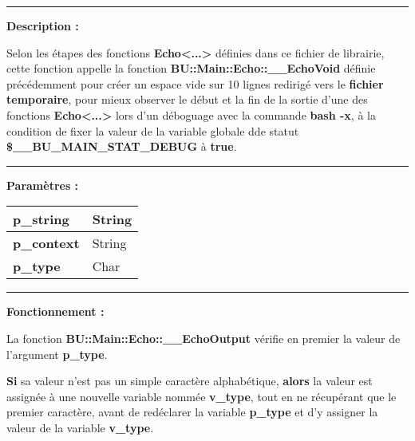 \documentclass[a4paper,10pt]{article}
\begin{document}

\par\noindent\rule{\textwidth}{0.4pt}

\begin{justify}
    \textbf{Description :}

    Selon les étapes des fonctions \textbf{\color{mauve}Echo<...>} définies dans ce fichier de librairie, cette fonction appelle la fonction \textbf{\color{mauve}BU::Main::Echo::\_\_EchoVoid} définie précédemment pour créer un espace vide sur 10 lignes redirigé vers le \textbf{\color{lime}fichier temporaire}, pour mieux observer le début et la fin de la sortie d'une des fonctions \textbf{\color{mauve}Echo<...>} lors d'un déboguage avec la commande \textbf{\color{gray}bash -x}, à la condition de fixer la valeur de la variable globale dde statut \textbf{\color{orange}\$\_\_BU\_MAIN\_STAT\_DEBUG} à \textbf{true}.
\end{justify}


\par\noindent\rule{\textwidth}{0.4pt}

\begin{justify}
    \textbf{Paramètres :}

    \begin{tabular}{|l|l|}
        \hline
        \textbf{\color{orange}p\_string} & String\\
        \hline
        \textbf{\color{orange}p\_context} & String\\
        \hline
        \textbf{\color{orange}p\_type} & Char\\
        \hline
    \end{tabular}
\end{justify}\setlength{\parskip}{2em}


\par\noindent\rule{\textwidth}{0.4pt}\setlength{\parskip}{1em}

\begin{justify}
    \textbf{Fonctionnement :}

    La fonction \textbf{\color{mauve}BU::Main::Echo::\_\_EchoOutput} vérifie en premier la valeur de l'argument \textbf{\color{orange}p\_type}.
\end{justify}

\begin{justify}
    \textbf{\color{brick}Si} sa valeur n'est pas un simple caractère alphabétique, \textbf{\color{brick}alors} la valeur est assignée à une nouvelle variable nommée \textbf{\color{orange}v\_type}, tout en ne récupérant que le premier caractère, avant de redéclarer la variable \textbf{\color{orange}p\_type} et d'y assigner la valeur de la variable \textbf{\color{orange}v\_type}.
\end{justify}
\end{document}
